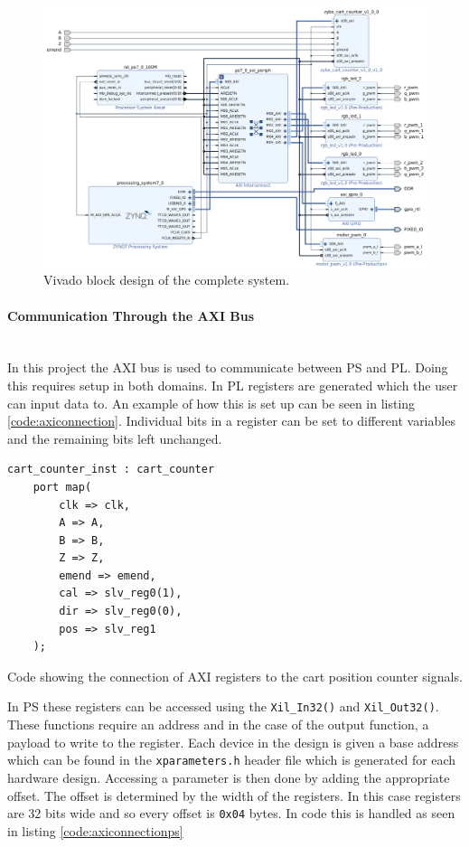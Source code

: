 \begin{figure}[h]
	\centering
	\includegraphics[width=\linewidth]{graphics/block_design}
	\caption{Vivado block design of the complete system.}
	\label{fig:blockdesign}
\end{figure}

\paragraph{Communication Through the AXI Bus}~\\ %
\label{par:communication_through_the_axi_bus}
In this project the AXI bus is used to communicate between PS and PL.
Doing this requires setup in both domains.
In PL registers are generated which the user can input data to.
An example of how this is set up can be seen in listing \ref{code:axiconnection}.
Individual bits in a register can be set to different variables and the remaining bits left unchanged.

\begin{listing}[H]
\begin{verbatim}
cart_counter_inst : cart_counter
	port map(
	    clk => clk,
	    A => A,
	    B => B,
	    Z => Z,
	    emend => emend,
	    cal => slv_reg0(1),
	    dir => slv_reg0(0),
	    pos => slv_reg1
	);
\end{verbatim}
\caption[Code showing the connection of AXI registers]{Code showing the connection of AXI registers to the cart position counter signals.}
\label{code:axiconnection}
\end{listing}

In PS these registers can be accessed using the \texttt{Xil\_In32()} and \texttt{Xil\_Out32()}.
These functions require an address and in the case of the output function, a payload to write to the register.
Each device in the design is given a base address which can be found in the \texttt{xparameters.h} header file which is generated for each hardware design.
Accessing a parameter is then done by adding the appropriate offset.
The offset is determined by the width of the registers.
In this case registers are 32 bits wide and so every offset is \texttt{0x04} bytes.
In code this is handled as seen in listing \ref{code:axiconnectionps}

